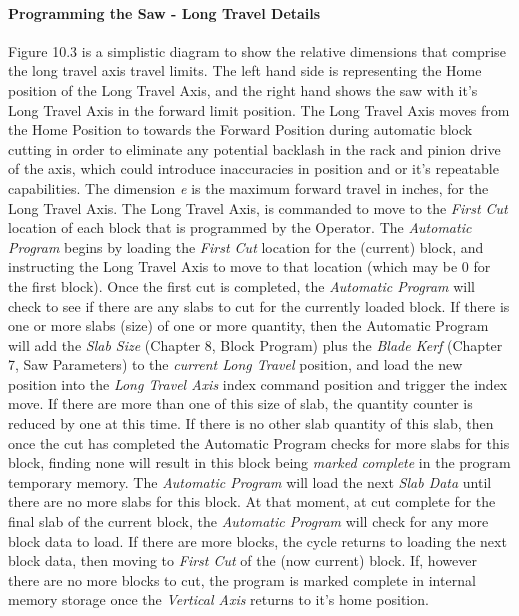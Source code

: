 \paragraph*{Programming the Saw - Long Travel Details}Figure 10.3 is a simplistic diagram to show the relative dimensions that comprise the long travel axis travel limits. The left hand side is representing the Home position of the Long Travel Axis, and the right hand shows the saw with it's Long Travel Axis in the forward limit position. The Long Travel Axis moves from the Home Position to towards the Forward Position during automatic block cutting in order to eliminate any potential backlash in the rack and pinion drive of the axis, which could introduce inaccuracies in position and or it's repeatable capabilities. The dimension \textit{e} is the maximum forward travel in inches, for the Long Travel Axis. The Long Travel Axis, is commanded to move to the \textit{First Cut} location of each block that is programmed by the Operator. The \textit{Automatic Program} begins by loading the \textit{First Cut} location for the (current) block, and instructing the Long Travel Axis to move to that location (which may be 0 for the first block). Once the first cut is completed, the \textit{Automatic Program} will check to see if there are any slabs to cut for the currently loaded block. If there is one or more slabs (size) of one or more quantity, then the Automatic Program will add the \textit{Slab Size} (Chapter 8, Block Program) plus the \textit{Blade Kerf} (Chapter 7, Saw Parameters) to the \textit{current Long Travel} position, and load the new position into the \textit{Long Travel Axis} index command position and trigger the index move. If there are more than one of this size of slab, the quantity counter is reduced by one at this time. If there is no other slab quantity of this slab, then once the cut has completed the Automatic Program checks for more slabs for this block, finding none will result in this block being \textit{marked complete} in the program temporary memory. The \textit{Automatic Program} will load the next \textit{Slab Data} until there are no more slabs for this block. At that moment, at cut complete for the final slab of the current block, the \textit{Automatic Program} will check for any more block data to load. If there are more blocks, the cycle returns to loading the next block data, then moving to \textit{First Cut} of the (now current) block. If, however there are no more blocks to cut, the program is marked complete in internal memory storage once the \textit{Vertical Axis} returns to it's home position.
